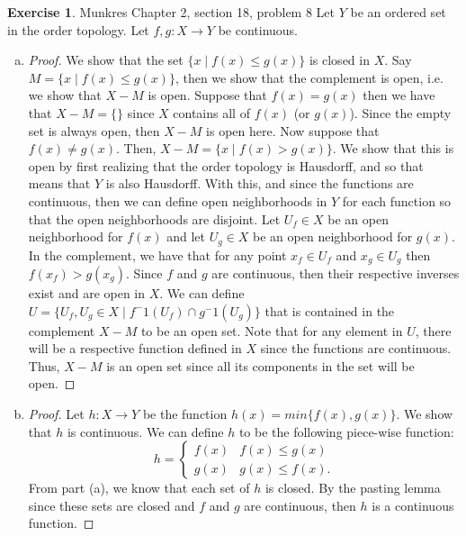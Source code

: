 \documentclass[12pt]{article}
\theoremstyle{definition}
\newtheorem{exercise}{Exercise}
\begin{document}
\begin{exercise} Munkres Chapter 2, section 18, problem 8 \newline
	Let $Y$ be an ordered set in the order topology. Let $f,g:X\to Y$ be continuous.
\begin{enumerate}[(a)]
	\item \begin{proof}
		We show that the set $\{x\mid f(x)\leq g(x)\}$ is closed in $X$. Say $M=\{x\mid f(x)\leq g(x)\}$, then we show that the complement is open, i.e. we show that $X-M$ is open. Suppose that $f(x)=g(x)$ then we have that $X-M=\{\}$ since $X$ contains all of $f(x)$ (or $g(x)$). Since the empty set is always open, then $X-M$ is open here. Now suppose that $f(x)\neq g(x)$. Then, $X-M=\{x\mid f(x)> g(x)\}$. We show that this is open by first realizing that the order topology is Hausdorff, and so that means that $Y$ is also Hausdorff. With this, and since the functions are continuous, then we can define open neighborhoods in $Y$ for each function so that the open neighborhoods are disjoint. Let $U_f\in X$ be an open neighborhood for $f(x)$ and let $U_g\in X$ be an open neighborhood for $g(x)$. In the complement, we have that for any point $x_f\in U_f$ and $x_g\in U_g$ then $f(x_f)>g(x_g)$. Since $f$ and $g$ are continuous, then their respective inverses exist and are open in $X$. We can define $U=\{U_f,U_g\in X\mid f^-1(U_f)\cap g^-1(U_g)\}$ that is contained in the complement $X-M$ to be an open set. Note that for any element in $U$, there will be a respective function defined in $X$ since the functions are continuous. Thus, $X-M$ is an open set since all its components in the set will be open.
		\end{proof} 
	\item \begin{proof}
		Let $h:X\to Y$ be the function $h(x)=min\{f(x),g(x)\}$. We show that $h$ is continuous. We can define $h$ to be the following piece-wise function: \[h=\begin{cases}f(x)&f(x)\leq g(x)\\g(x)&g(x)\leq f(x).\end{cases}\] From part (a), we know that each set of $h$ is closed. By the pasting lemma since these sets are closed and $f$ and $g$ are continuous, then $h$ is a continuous function. 
	\end{proof}
\end{enumerate}
\end{exercise}
\end{document}
